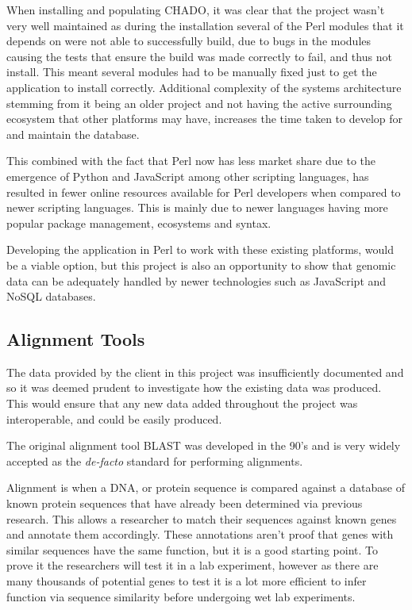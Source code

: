 When installing and populating CHADO, it was clear that the project wasn't very well maintained as during the installation several of the Perl modules that it depends on were not able to successfully build, due to bugs in the modules causing the tests that ensure the build was made correctly to fail, and thus not install. This meant several modules had to be manually fixed just to get the application to install correctly. Additional complexity of the systems architecture stemming from it being an older project and not having the active surrounding ecosystem that other platforms may have, increases the time taken to develop for and maintain the database.

This combined with the fact that Perl now has less market share\cite{perl-market} due to the emergence of Python\cite{python} and JavaScript\cite{node} among other scripting languages, has resulted in fewer online resources available for Perl developers when compared to newer scripting languages. This is mainly due to newer languages having more popular package management, ecosystems and syntax. 

Developing the application in Perl to work with these existing platforms, would be a viable option, but this project is also an opportunity to show that genomic data can be adequately handled by newer technologies such as JavaScript and NoSQL databases.

\subsection{Alignment Tools}
The data provided by the client in this project was insufficiently documented and so it was deemed prudent to investigate how the existing data was produced. This would ensure that any new data added throughout the project was interoperable, and could be easily produced.

The original alignment tool BLAST\cite{blast} was developed in the 90's and is very widely accepted as the {\it de-facto} standard for performing alignments. 

Alignment is when a DNA, or protein sequence is compared against a database of known protein sequences that have already been determined via previous research. This allows a researcher to match their sequences against known genes and annotate them accordingly. These annotations aren't proof that genes with similar sequences have the same function, but it is a good starting point. To prove it the researchers will test it in a lab experiment, however as there are many thousands of potential genes to test it is a lot more efficient to infer function via sequence similarity before undergoing wet lab experiments.

